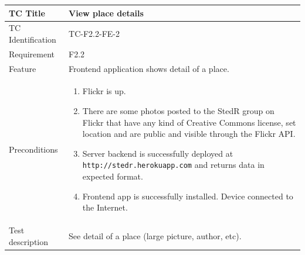 \documentclass[11pt]{book}
\begin{document}
\begin{table}
  \begin{tabular}{| p{3cm} | p{9.5cm} |} \hline 
    TC Title              & View place details \\ \hline 
    TC Identification     & TC-F2.2-FE-2 \\ \hline 
    Requirement           & F2.2 \\ \hline 
    Feature               & Frontend application shows detail of a place. \\ \hline 
    Preconditions         & \begin{enumerate}
                              \item Flickr is up.
                              \item There are some photos posted to the StedR group on Flickr that have any kind of
                               Creative Commons license, set location and are public and visible through the Flickr API.
                              \item Server backend is successfully deployed at \texttt{http://stedr.herokuapp.com} and returns data in expected format.
                              \item Frontend app is successfully installed. Device connected to the Internet.
                            \end{enumerate} \\ \hline 

    Test description      & See detail of a place (large picture, author, etc).


\end{tabular}
\end{table}
\end{document}
